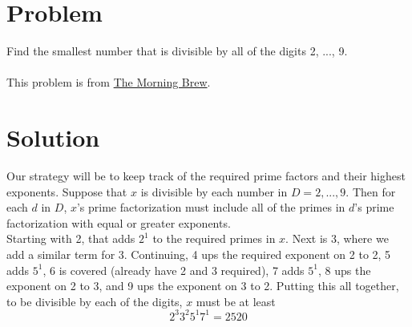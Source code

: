 \documentclass[11pt,a4paper]{report}
\theoremstyle{plain}
\theoremstyle{definition}
\theoremstyle{remark}
\begin{document}
\section*{Problem}
Find the smallest number that is divisible by all of the digits 2, ..., 9.
\\\\
This problem is from \href{https://www.morningbrew.com} {The Morning Brew}.

\newpage
\section*{Solution}
Our strategy will be to keep track of the required prime factors and their highest exponents.  Suppose that $x$ is divisible by each number in $D = {2, ..., 9}.$  Then for each $d$ in $D$, $x$'s prime factorization must include all of the primes in $d$'s prime factorization with equal or greater exponents. 
\\
Starting with 2, that adds $2^1$ to the required primes in $x$.  Next is 3, where we add a similar term for 3.  Continuing, 4 ups the required exponent on 2 to 2, 5 adds $5^1$, 6 is covered (already have 2 and 3 required), 7 adds $5^1$, 8 ups the exponent on 2 to 3,  and 9 ups the exponent on 3 to 2.  Putting this all together, to be divisible by each of the digits, $x$ must be at least
$$ 2^{3}3^{2}5^{1}7^{1} = 2520 $$
\end{document}
